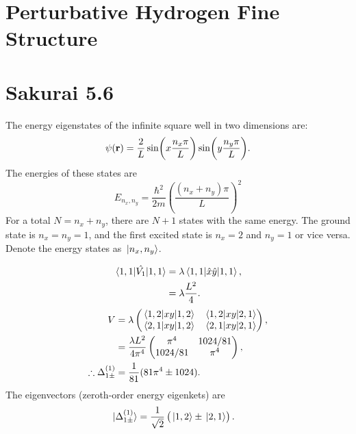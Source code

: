\documentclass[
a4paper,
10pt,
twoside,
]{article}
\begin{document}
\titleinf
\maketitle
\startmcols

\section{Perturbative Hydrogen Fine Structure}\label{sec: I}
\subsection{}\label{ssec: Ia}
\subsection{}\label{ssec: Ib}
\subsection{}\label{ssec: Ic}

\section{Sakurai 5.6}\label{sec: II}
The energy eigenstates of the infinite square well in two dimensions are:
\begin{equation}
	\psi(\vb{r}) = \frac{2}{L}\sin(x\frac{n_x\pi}{L})\sin(y\frac{n_y\pi}{L}).
\end{equation}
The energies of these states are
\begin{equation}
	E_{n_x,n_y} = \frac{\hbar^2}{2m} \left(\frac{(n_x+n_y)\pi}{L}\right)^2
\end{equation}
For a total $N = n_x + n_y$, there are $N+1$ states with the same energy.
The ground state is $n_x = n_y = 1$, and the first excited state is $n_x = 2$ and $n_y = 1$ or vice versa.
Denote the energy states as $\ket*{n_x,n_y}$.

\begin{align}
	\mel*{1,1}{\hat{V_1}}{1,1} &= \lambda\mel*{1,1}{\hat{x}\hat{y}}{1,1},\\
	&= \lambda \frac{L^2}{4}.
\end{align}
\begin{align}
	V &= \lambda \begin{pmatrix}
		\mel*{1,2}{xy}{1,2} & \mel*{1,2}{xy}{2,1}\\
		\mel*{2,1}{xy}{1,2} & \mel*{2,1}{xy}{2,1}
	\end{pmatrix},\\
	&= \frac{\lambda L^2}{4\pi^4} \begin{pmatrix}
		\pi^4 & 1024/81\\
		1024/81 & \pi^4
	\end{pmatrix},\\
	\therefore \Delta_{1\pm}^{(1)} &= \frac{1}{81}(81\pi^4 \pm 1024).
\end{align}
The eigenvectors (zeroth-order energy eigenkets) are
\begin{align}
	\ket*{\Delta_{1\pm}^{(1)}} &= \frac{1}{\sqrt{2}} \left(\ket*{1,2}\pm\ket*{2,1}\right).
\end{align}
\end{document}
